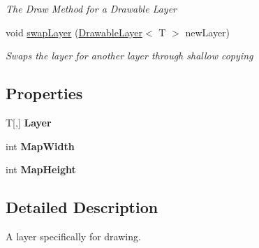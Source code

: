 \begin{DoxyCompactItemize}
\begin{DoxyCompactList}\small\item\em The Draw Method for a Drawable Layer \end{DoxyCompactList}\item 
void \hyperlink{class_tile_engine_1_1_drawable_layer_3_01_t_01_4_a6affc21c4de1bd7e35b7790a1ce7bfea}{swap\-Layer} (\hyperlink{class_tile_engine_1_1_drawable_layer_3_01_t_01_4_a75c68a1120810d78da78deb7e1842d6d}{Drawable\-Layer}$<$ T $>$ new\-Layer)
\begin{DoxyCompactList}\small\item\em Swaps the layer for another layer through shallow copying \end{DoxyCompactList}\end{DoxyCompactItemize}
\subsection*{Properties}
\begin{DoxyCompactItemize}
\item 
\hypertarget{class_tile_engine_1_1_drawable_layer_3_01_t_01_4_aa04b0945dfae8242798a620ab7fb73ec}{T\mbox{[},\mbox{]} {\bfseries Layer}}\label{class_tile_engine_1_1_drawable_layer_3_01_t_01_4_aa04b0945dfae8242798a620ab7fb73ec}

\item 
\hypertarget{class_tile_engine_1_1_drawable_layer_3_01_t_01_4_a61f8c541810f2a3d4e0adfb6ccab9045}{int {\bfseries Map\-Width}}\label{class_tile_engine_1_1_drawable_layer_3_01_t_01_4_a61f8c541810f2a3d4e0adfb6ccab9045}

\item 
\hypertarget{class_tile_engine_1_1_drawable_layer_3_01_t_01_4_ac92a235c150d1dd69bff8154a4f4f12e}{int {\bfseries Map\-Height}}\label{class_tile_engine_1_1_drawable_layer_3_01_t_01_4_ac92a235c150d1dd69bff8154a4f4f12e}

\end{DoxyCompactItemize}


\subsection{Detailed Description}
A layer specifically for drawing. 


